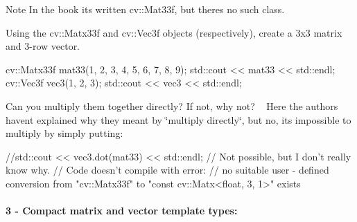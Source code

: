 \begin{DoxyNote}{Note}
In the book it\textquotesingle{}s written {\ttfamily cv\+::\+Mat33f}, but there\textquotesingle{}s no such class.
\end{DoxyNote}

\begin{DoxyEnumerate}
\item Using the {\ttfamily cv\+::\+Matx33f} and {\ttfamily cv\+::\+Vec3f} objects (respectively), create a 3x3 matrix and 3-\/row vector. 
\begin{DoxyCodeInclude}
    cv::Matx33f mat33(1, 2, 3, 4, 5, 6, 7, 8, 9);
    std::cout << mat33 << std::endl;
    cv::Vec3f vec3(1, 2, 3);
    std::cout << vec3 << std::endl;
\end{DoxyCodeInclude}

\item Can you multiply them together directly? If not, why not? ~\newline
 Here the authors haven\textquotesingle{}t explained why they meant by \char`\"{}multiply directly\char`\"{}, but no, it\textquotesingle{}s impossible to multiply by simply putting\+: 
\begin{DoxyCodeInclude}
    \textcolor{comment}{//std::cout << vec3.dot(mat33) << std::endl;}
    \textcolor{comment}{// Not possible, but I don't really know why.}
    \textcolor{comment}{// Code doesn't compile with error: }
    \textcolor{comment}{// no suitable user - defined conversion from "cv::Matx33f" to "const cv::Matx<float, 3, 1>" exists }
\end{DoxyCodeInclude}
 \paragraph*{3 -\/ Compact matrix and vector template types\+:}
\end{DoxyEnumerate}


